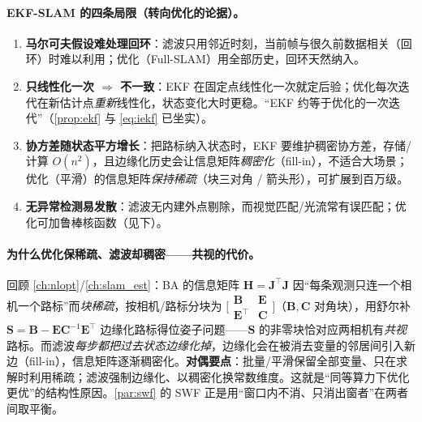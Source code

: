 \paragraph{EKF-SLAM 的四条局限（转向优化的论据）。}\cite{gaoxiang2019slam14}
\begin{enumerate}
  \item \textbf{马尔可夫假设难处理回环}：滤波只用邻近时刻，当前帧与很久前数据相关（回环）时难以利用；优化（Full-SLAM）用全部历史，回环天然纳入。
  \item \textbf{只线性化一次 $\Rightarrow$ 不一致}：EKF 在固定点线性化一次就定后验；优化每次迭代在新估计点\emph{重新}线性化，状态变化大时更稳。“EKF 约等于优化的一次迭代”（\cref{prop:ekf} 与 \cref{eq:iekf} 已坐实）。
  \item \textbf{协方差随状态平方增长}：把路标纳入状态时，EKF 要维护稠密协方差，存储/计算 $O(n^2)$，且边缘化历史会让信息矩阵\emph{稠密化}（fill-in），不适合大场景；优化（平滑）的信息矩阵\emph{保持稀疏}（块三对角 / 箭头形），可扩展到百万级\cite{carlone2026handbook}。
  \item \textbf{无异常检测易发散}：滤波无内建外点剔除，而视觉匹配/光流常有误匹配；优化可加鲁棒核函数（见下）。
\end{enumerate}

\paragraph{为什么优化保稀疏、滤波却稠密——共视的代价。}
回顾 \cref{ch:nlopt}/\cref{ch:slam_est}：BA 的信息矩阵 $\mathbf{H}=\mathbf{J}^\top\mathbf{J}$ 因“每条观测只连一个相机一个路标”而\emph{块稀疏}，按相机/路标分块为 $\big[\begin{smallmatrix}\mathbf{B}&\mathbf{E}\\\mathbf{E}^\top&\mathbf{C}\end{smallmatrix}\big]$（$\mathbf{B},\mathbf{C}$ 对角块），用舒尔补 $\mathbf{S}=\mathbf{B}-\mathbf{E}\mathbf{C}^{-1}\mathbf{E}^\top$ 边缘化路标得位姿子问题——$\mathbf{S}$ 的非零块恰对应两相机有\emph{共视}路标。而滤波\emph{每步都把过去状态边缘化掉}，边缘化会在被消去变量的邻居间引入新边（fill-in），信息矩阵逐渐稠密化。\textbf{对偶要点}：批量/平滑保留全部变量、只在求解时利用稀疏；滤波强制边缘化、以稠密化换常数维度。这就是“同等算力下优化更优”的结构性原因。\cref{par:swf} 的 SWF 正是用“窗口内不消、只消出窗者”在两者间取平衡。

